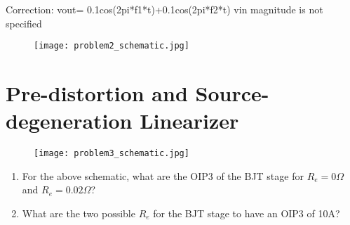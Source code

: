{\color{red} Correction: vout= 0.1cos(2pi*f1*t)+0.1cos(2pi*f2*t) vin magnitude is not specified}

\begin{figure}[H]
    \centering \texttt{[image: problem2\_schematic.jpg]}
\end{figure}

\section{Pre-distortion and Source-degeneration Linearizer}
\begin{figure}[H]
    \centering \texttt{[image: problem3\_schematic.jpg]}
\end{figure}

\begin{enumerate}[label=(\alph*)]
    \item {\color{blue} For the above schematic, what are the OIP3 of the BJT stage for $R_e = 0 \Omega$ and $R_e = 0.02 \Omega$?}

    \item {\color{blue} What are the two possible $R_e$ for the BJT stage to have an OIP3 of 10A?}
\end{enumerate}


